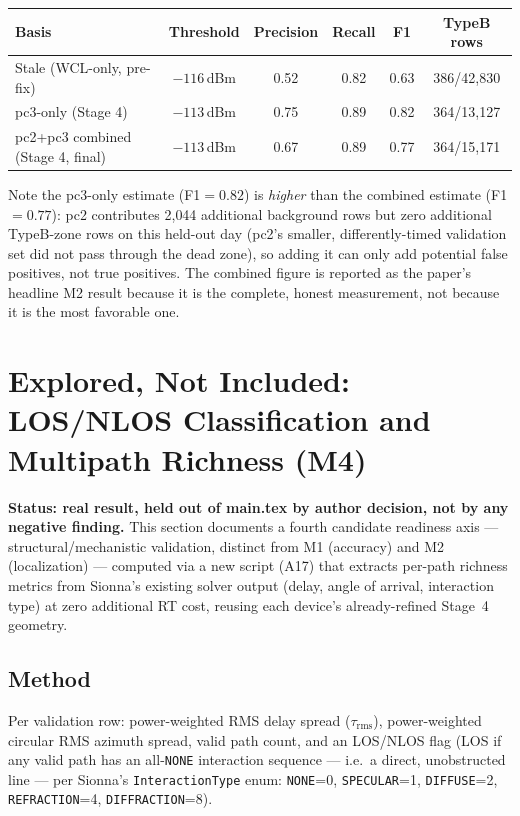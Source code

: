 \documentclass[11pt]{article}
\begin{document}
\begin{table}[h]
\centering
\begin{tabular}{lccccc}
\toprule
Basis & Threshold & Precision & Recall & F1 & TypeB rows \\
\midrule
Stale (WCL-only, pre-fix)      & $-116$\,dBm & 0.52 & 0.82 & 0.63 & 386/42{,}830 \\
pc3-only (Stage 4)             & $-113$\,dBm & 0.75 & 0.89 & 0.82 & 364/13{,}127 \\
pc2+pc3 combined (Stage 4, final) & $-113$\,dBm & 0.67 & 0.89 & 0.77 & 364/15{,}171 \\
\bottomrule
\end{tabular}
\end{table}

Note the pc3-only estimate (F1$=0.82$) is \emph{higher} than the combined
estimate (F1$=0.77$): pc2 contributes 2{,}044 additional background rows
but zero additional TypeB-zone rows on this held-out day (pc2's smaller,
differently-timed validation set did not pass through the dead zone),
so adding it can only add potential false positives, not true positives.
The combined figure is reported as the paper's headline M2 result because
it is the complete, honest measurement, not because it is the most
favorable one.

\section{Explored, Not Included: LOS/NLOS Classification and Multipath Richness (M4)}
\label{sec:m4}

\textbf{Status: real result, held out of main.tex by author decision, not
by any negative finding.} This section documents a fourth candidate
readiness axis — structural/mechanistic validation, distinct from M1
(accuracy) and M2 (localization) — computed via a new script (A17) that
extracts per-path richness metrics from Sionna's existing solver output
(delay, angle of arrival, interaction type) at zero additional RT cost,
reusing each device's already-refined Stage~4 geometry.

\subsection{Method}
Per validation row: power-weighted RMS delay spread ($\tau_\text{rms}$),
power-weighted circular RMS azimuth spread, valid path count, and an
LOS/NLOS flag (LOS if any valid path has an all-\texttt{NONE} interaction
sequence — i.e.\ a direct, unobstructed line — per Sionna's
\texttt{InteractionType} enum: \texttt{NONE}=0, \texttt{SPECULAR}=1,
\texttt{DIFFUSE}=2, \texttt{REFRACTION}=4, \texttt{DIFFRACTION}=8).
\end{document}
